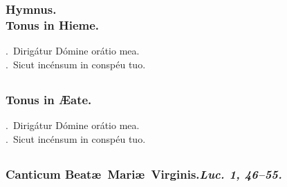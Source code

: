 \documentclass[12pt]{article} %
\newenvironment{response}{\leftskip 0in \setlength{\parindent}{0in}}{\vspace{2 mm}}
\let\oldVbar\Vbar
\renewcommand{\Vbar}{\textcolor{benred8}{\oldVbar .}}
\let\oldRbar\Rbar
\renewcommand{\Rbar}{\textcolor{benred8}{\oldRbar .}}
\def\capitulumSpace{\hspace{20 mm}}
\begin{document}
\subsubsection*{Hymnus.\\Tonus in Hieme.}


\gresetfirstlineaboveinitial{\small \textsc{ \textbf{\textcolor{benred8}{VIII}}}}{\small \textsc{ \textbf{\textcolor{benred8}{VIII}}}}

\begin{response}
\Vbar\ Dirig\'{a}tur D\'{o}mine or\'{a}tio mea.\\
\Rbar\ Sicut inc\'{e}nsum in consp\'{e}u tuo.

\end{response}


\subsection*{}

\subsubsection*{Tonus in \AE {}ate.}


\gresetfirstlineaboveinitial{\small \textsc{ \textbf{\textcolor{benred8}{I}}}}{\small \textsc{ \textbf{\textcolor{benred8}{I}}}}

\begin{response}
\Vbar\ Dirig\'{a}tur D\'{o}mine or\'{a}tio mea.\\
\Rbar\ Sicut inc\'{e}nsum in consp\'{e}u tuo.

\end{response}


\subsection*{}

\subsubsection*{Canticum Beat\ae\ Mari\ae\ Virginis.\capitulumSpace \emph{Luc. 1, 46--55.}}
\end{document}
